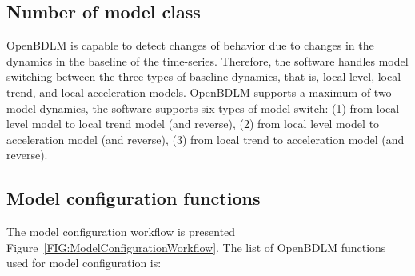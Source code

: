 \subsection{Number of model class}

OpenBDLM is capable to detect changes of behavior due to changes in the dynamics in the baseline of the time-series. 
Therefore, the software handles model switching between the three types of baseline dynamics, that is, local level, local trend, and local acceleration models. 
OpenBDLM supports a maximum of two model dynamics, the software supports six types of model switch: (1) from local level model to local trend model (and reverse), (2) from local level model to acceleration model (and reverse), (3) from local trend to acceleration model (and reverse).


\subsection{Model configuration functions}

The model configuration workflow is presented Figure~\ref{FIG:ModelConfigurationWorkflow}. The list of OpenBDLM functions used for model configuration is:

